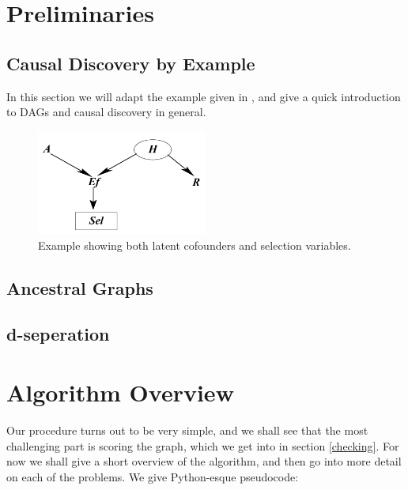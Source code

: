 \documentclass[11pt,a4paper]{report}
\begin{document}
\chapter{Preliminaries}\label{preliminaries}
\section{Causal Discovery by Example}
In this section we will adapt the example given in
\cite{zhangCompletenessOrientationRules2008}, and give a quick
introduction to DAGs and causal discovery in general.

\begin{figure}
  \centering
  \includegraphics[width=0.5\textwidth]{imgs/example1.png}
  \caption{Example showing both latent cofounders and selection variables.}
  \label{example}
\end{figure}

\section{Ancestral Graphs}

\section{d-seperation}

\chapter{Algorithm Overview}\label{algorithm}
Our procedure turns out to be very simple, and we shall see that the most
challenging part is scoring the graph, which we get into in section
\ref{checking}. For now we shall give a short overview of the algorithm,
and then go into more detail on each of the problems. We give Python-esque
pseudocode:
\end{document}
